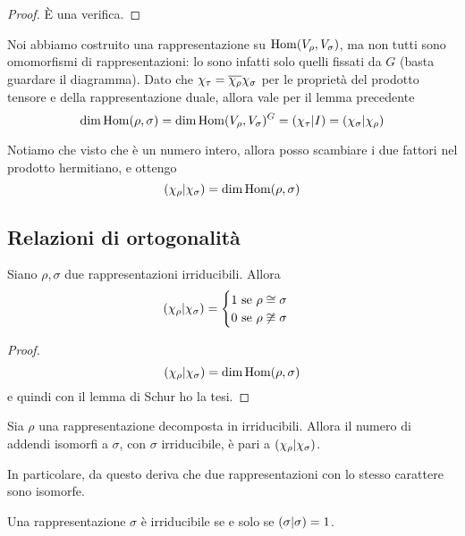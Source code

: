 \begin{proof}
  \`E una verifica.
\end{proof}

Noi abbiamo costruito una rappresentazione su $\operatorname{Hom}(V_\rho,V_\sigma)$, ma non tutti sono omomorfismi di rappresentazioni: lo sono infatti solo quelli fissati da $G$ (basta guardare il diagramma). Dato che $\chi_\tau = \overline{\chi_\rho}\chi_\sigma$ per le proprietà del prodotto tensore e della rappresentazione duale, allora vale per il lemma precedente
\[
  \dim \operatorname{Hom}(\rho,\sigma) = \dim \operatorname{Hom}(V_\rho,V_\sigma)^G = \left(\chi_\tau | I\right) = \left(\chi_\sigma | \chi_\rho\right)
\]

Notiamo che visto che è un numero intero, allora posso scambiare i due fattori nel prodotto hermitiano, e ottengo
\[
  \left(\chi_\rho | \chi_\sigma\right) = \dim \operatorname{Hom}(\rho,\sigma)
\]







\subsection{Relazioni di ortogonalità}
\begin{mytheorem}
  Siano $\rho,\sigma$ due rappresentazioni irriducibili. Allora
  \[
  \left(\chi_\rho | \chi_\sigma\right) = \begin{cases}
			1 \mbox{ se } \rho \cong \sigma \\
			0 \mbox{ se } \rho \not\cong \sigma
		      \end{cases}
  \]
\end{mytheorem}
\begin{proof}
  \[
  \left(\chi_\rho | \chi_\sigma\right)=\dim \operatorname{Hom}(\rho,\sigma)
  \]
  e quindi con il lemma di Schur ho la tesi.
\end{proof}

\begin{myprop}\label{pr:IrrCount}
  Sia $\rho$ una rappresentazione decomposta in irriducibili. Allora il numero di addendi isomorfi a $\sigma$, con $\sigma$ irriducibile, è pari a $\left(\chi_\rho | \chi_\sigma\right)$.
\end{myprop}

In particolare, da questo deriva che due rappresentazioni con lo stesso carattere sono isomorfe.

\begin{mytheorem}
  Una rappresentazione $\sigma$ è irriducibile se e solo se $\left(\sigma | \sigma\right)=1$.
\end{mytheorem}

